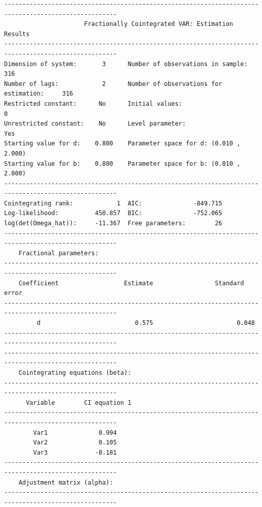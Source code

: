 \documentclass[article]{jss}
\begin{document}
\begin{verbatim}
-----------------------------------------------------------------------------------------------------
                      Fractionally Cointegrated VAR: Estimation Results                              
-----------------------------------------------------------------------------------------------------
Dimension of system:       3      Number of observations in sample:          316 
Number of lags:            2      Number of observations for estimation:     316 
Restricted constant:      No      Initial values:                              0
Unrestricted constant:    No      Level parameter:                           Yes
Starting value for d:    0.800    Parameter space for d: (0.010 , 2.000) 
Starting value for b:    0.800    Parameter space for b: (0.010 , 2.000) 
-----------------------------------------------------------------------------------------------------
Cointegrating rank:            1  AIC:              -849.715 
Log-likelihood:          450.857  BIC:              -752.065 
log(det(Omega_hat)):     -11.367  Free parameters:        26 
-----------------------------------------------------------------------------------------------------
    Fractional parameters:                                                                             
-----------------------------------------------------------------------------------------------------
    Coefficient              	 Estimate              	  Standard error 
-----------------------------------------------------------------------------------------------------
         d                   	    0.575              	        0.048                
-----------------------------------------------------------------------------------------------------
-----------------------------------------------------------------------------------------------------
    Cointegrating equations (beta):                                                                  
-----------------------------------------------------------------------------------------------------
      Variable        CI equation 1  
-----------------------------------------------------------------------------------------------------
        Var1              0.994     
        Var2              0.105     
        Var3             -0.181     
-----------------------------------------------------------------------------------------------------
    Adjustment matrix (alpha):                                                                         
-----------------------------------------------------------------------------------------------------

\end{verbatim}
\end{document}
